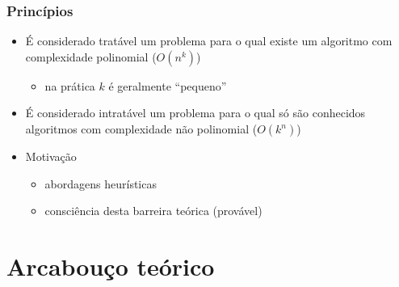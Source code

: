 \documentclass{beamer}
\begin{document}

\begin{frame}
\frametitle{Princípios}

\begin{itemize}
\item É considerado \alert{tratável} um problema para o qual existe um
  algoritmo com complexidade polinomial ($O(n^k)$)
  \begin{itemize}
  \item na prática $k$ é geralmente ``pequeno''
  \end{itemize}
\item É considerado \alert{intratável} um problema para o qual só são conhecidos
  algoritmos com complexidade não polinomial ($O(k^n)$)
\item Motivação
  \begin{itemize}
  \item abordagens heurísticas
  \item consciência desta barreira teórica (provável)
  \end{itemize}
\end{itemize}

\end{frame}

\section{Arcabouço teórico}
\end{document}
